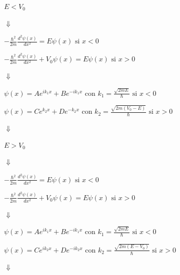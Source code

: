 \documentclass[oneside]{book}
\numberwithin{equation}{section}
\numberwithin{figure}{section}
\numberwithin{table}{section}
\begin{document}
				\begin{minipage}[t]{0.5\textwidth}
					\begin{center}
						\textbf{$E<V_0$}
					\end{center}
					\begin{center}
						$\Downarrow$
					\end{center}
					\begin{center}
						$\displaystyle -\frac{\hbar^2}{2m}\frac{d^2\psi(x)}{dx^2}=E\psi(x) \text{ si } x<0$
					\end{center}
					\begin{center}
						$\displaystyle -\frac{\hbar^2}{2m}\frac{d^2\psi(x)}{dx^2}+V_0\psi(x)=E\psi(x) \text{ si } x>0$
					\end{center}
					\begin{center}
						$\Downarrow$
					\end{center}
					\begin{center}
						$\displaystyle \psi(x)=Ae^{ik_1x}+Be^{-ik_1x} \text{ con } k_1=\frac{\sqrt{2mE}}{\hbar} \text{ si } x<0$
					\end{center}
					\begin{center}
						$\displaystyle \psi(x)=Ce^{k_2x}+De^{-k_2x} \text{ con } k_2=\frac{\sqrt{2m(V_0-E)}}{\hbar} \text{ si } x>0$
					\end{center}
					\begin{center}
						$\Downarrow$
					\end{center}
				\end{minipage}
				\begin{minipage}[t]{0.5\textwidth}
					\begin{center}
						\textbf{$E>V_0$}
					\end{center}
					\begin{center}
						$\Downarrow$
					\end{center}
					\begin{center}
						$\displaystyle -\frac{\hbar^2}{2m}\frac{d^2\psi(x)}{dx^2}=E\psi(x) \text{ si } x<0$
					\end{center}
					\begin{center}
						$\displaystyle -\frac{\hbar^2}{2m}\frac{d^2\psi(x)}{dx^2}+V_0\psi(x)=E\psi(x) \text{ si } x>0$
					\end{center}
					\begin{center}
						$\Downarrow$
					\end{center}
					\begin{center}
						$\displaystyle \psi(x)=Ae^{ik_1x}+Be^{-ik_1x} \text{ con } k_1=\frac{\sqrt{2mE}}{\hbar} \text{ si } x<0$
					\end{center}
					\begin{center}
						$\displaystyle \psi(x)=Ce^{ik_2x}+De^{-ik_2x} \text{ con } k_2=\frac{\sqrt{2m(E-V_0)}}{\hbar} \text{ si } x>0$
					\end{center}
					\begin{center}
						$\Downarrow$
					\end{center}
				\end{minipage}
				
\end{document}
